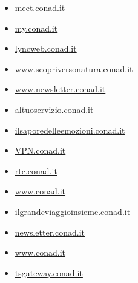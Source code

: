 \documentclass{article}
\begin{document}
\begin{itemize}
            
            \item \href{ https://meet.conad.it/ }{ meet.conad.it }
        
            
            \item \href{ https://my.conad.it/login }{ my.conad.it }
        
            
            \item \href{ https://lyncweb.conad.it/ }{ lyncweb.conad.it }
        
            
            \item \href{ https://www.scopriversonatura.conad.it/ }{ www.scopriversonatura.conad.it }
        
            
            \item \href{ https://www.newsletter.conad.it/ }{ www.newsletter.conad.it }
        
            
            \item \href{ https://altuoservizio.conad.it/login.html }{ altuoservizio.conad.it }
        
            
            \item \href{ http://ilsaporedelleemozioni.conad.it/ }{ ilsaporedelleemozioni.conad.it }
        
            
            \item \href{ http://VPN.conad.it }{ VPN.conad.it }
        
            
            \item \href{ http://rtc.conad.it }{ rtc.conad.it }
        
            
            \item \href{ https://www.conad.it/contenuti/landing\_CIA/CIA\_promo\_locale\_50\_settembre.html?utm\_source=crm\&utm\_medium=push\&utm\_campaign=cia\_2021\_SottoscrizioneCC\_Set\_02 }{ www.conad.it }
        
            
            \item \href{ https://ilgrandeviaggioinsieme.conad.it/ }{ ilgrandeviaggioinsieme.conad.it }
        
            
            \item \href{ https://newsletter.conad.it/ }{ newsletter.conad.it }
        
            
            \item \href{ https://www.conad.it/esperienze-di-gusto.html }{ www.conad.it }
        
            
            \item \href{ https://tsgateway.conad.it/RDWeb/Pages/en-US/login.aspx?ReturnUrl=/RDWeb/Pages/en-US/Default.aspx }{ tsgateway.conad.it }
        

\end{itemize}
\end{document}
